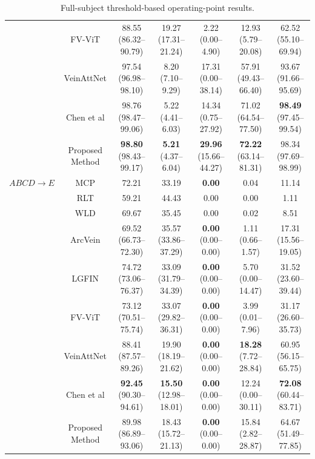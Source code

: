 \documentclass[11pt]{article}
\begin{document}
\begin{table}[ht!]
{\begin{tabular}{|c|c|c|c|c|c|c|}
         & FV-ViT & 88.55 (86.32--90.79) & 19.27 (17.31--21.24) & 2.22 (0.00--4.90) & 12.93 (5.79--20.08) & 62.52 (55.10--69.94) \\
         & VeinAttNet & 97.54 (96.98--98.10) & 8.20 (7.10--9.29) & 17.31 (0.00--38.14) & 57.91 (49.43--66.40) & 93.67 (91.66--95.69) \\
         & Chen et al & 98.76 (98.47--99.06) & 5.22 (4.41--6.03) & 14.34 (0.75--27.92) & 71.02 (64.54--77.50) & \textbf{98.49} (97.45--99.54) \\
         & Proposed Method & \textbf{98.80} (98.43--99.17) & \textbf{5.21} (4.37--6.04) & \textbf{29.96} (15.66--44.27) & \textbf{72.22} (63.14--81.31) & 98.34 (97.69--98.99) \\
        \hline
        $ABCD \rightarrow E$ & MCP & 72.21 & 33.19 & \textbf{0.00} & 0.04 & 11.14 \\
         & RLT & 59.21 & 44.43 & 0.00 & 0.00 & 1.11 \\
         & WLD & 69.67 & 35.45 & 0.00 & 0.02 & 8.51 \\
         & ArcVein & 69.52 (66.73--72.30) & 35.57 (33.86--37.29) & \textbf{0.00} (0.00--0.00) & 1.11 (0.66--1.57) & 17.31 (15.56--19.05) \\
         & LGFIN & 74.72 (73.06--76.37) & 33.09 (31.79--34.39) & \textbf{0.00} (0.00--0.00) & 5.70 (0.00--14.47) & 31.52 (23.60--39.44) \\
         & FV-ViT & 73.12 (70.51--75.74) & 33.07 (29.82--36.31) & \textbf{0.00} (0.00--0.00) & 3.99 (0.01--7.96) & 31.17 (26.60--35.73) \\
         & VeinAttNet & 88.41 (87.57--89.26) & 19.90 (18.19--21.62) & \textbf{0.00} (0.00--0.00) & \textbf{18.28} (7.72--28.84) & 60.95 (56.15--65.75) \\
         & Chen et al & \textbf{92.45} (90.30--94.61) & \textbf{15.50} (12.98--18.01) & \textbf{0.00} (0.00--0.00) & 12.24 (0.00--30.11) & \textbf{72.08} (60.44--83.71) \\
         & Proposed Method & 89.98 (86.89--93.06) & 18.43 (15.72--21.13) & \textbf{0.00} (0.00--0.00) & 15.84 (2.82--28.87) & 64.67 (51.49--77.85) \\
        \hline
    \end{tabular}}
    \caption{Full-subject threshold-based operating-point results.}
    \label{tab:rebuttal_full_thresholds}
\end{table}
\end{document}
